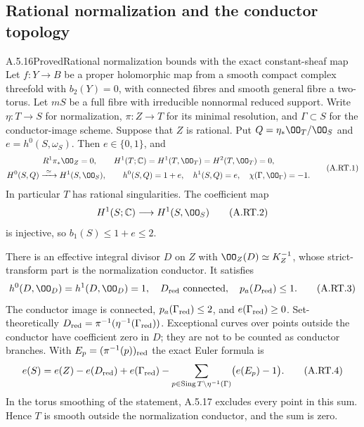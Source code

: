 \subsection{Rational normalization and the conductor topology}

\begin{statement}{A.5.16}{Proved}{Rational normalization bounds with the exact constant-sheaf map}
Let $f:Y\to B$ be a proper holomorphic map from a smooth compact
complex threefold with $b_2(Y)=0$, with connected fibres and smooth
general fibre a two-torus. Let $mS$ be a full fibre with irreducible
nonnormal reduced support. Write $\eta:T\to S$ for normalization,
$\pi:Z\to T$ for its minimal resolution, and $\Gamma\subset S$
for the conductor-image scheme. Suppose that $Z$ is rational.
Put $Q=\eta_*\OO_T/\OO_S$ and $e=h^0(S,\omega_S)$.
Then $e\in\{0,1\}$, and
\[
\begin{gathered}
 R^1\pi_*\OO_Z=0,\qquad
 H^1(T;\mathbb C)=H^1(T,\OO_T)=H^2(T,\OO_T)=0,\\
 H^0(S,Q)\xrightarrow{\ \simeq\ }H^1(S,\OO_S),\qquad
 h^0(S,Q)=1+e,\quad h^1(S,Q)=e,\quad
 \chi(\Gamma,\OO_\Gamma)=-1.
\end{gathered}
\tag{A.RT.1}
\]
In particular $T$ has rational singularities. The coefficient map
\[
 H^1(S;\mathbb C)\longrightarrow H^1(S,\OO_S)
\tag{A.RT.2}
\]
is injective, so $b_1(S)\le1+e\le2$.

There is an effective integral divisor $D$ on $Z$ with
$\OO_Z(D)\simeq K_Z^{-1}$, whose strict-transform part is the
normalization conductor. It satisfies
\[
 h^0(D,\OO_D)=h^1(D,\OO_D)=1,
 \quad D_{\rm red}\text{ connected},
 \quad p_a(D_{\rm red})\le1.
\tag{A.RT.3}
\]
The conductor image is connected,
$p_a(\Gamma_{\rm red})\le2$, and
$e(\Gamma_{\rm red})\ge0$. Set-theoretically
$D_{\rm red}=\pi^{-1}(\eta^{-1}(\Gamma_{\rm red}))$.
Exceptional curves over points outside the conductor have
coefficient zero in $D$; they are not to be counted as conductor
branches. With $E_p=(\pi^{-1}(p))_{\rm red}$ the exact Euler
formula is
\[
 e(S)=e(Z)-e(D_{\rm red})+e(\Gamma_{\rm red})
       -\sum_{p\in\operatorname{Sing}T\setminus\eta^{-1}(\Gamma)}
                  \bigl(e(E_p)-1\bigr).
\tag{A.RT.4}
\]
In the torus smoothing of the statement, A.5.17 excludes
every point in this sum. Hence $T$ is smooth outside the
normalization conductor, and the sum is zero.
\end{statement}
